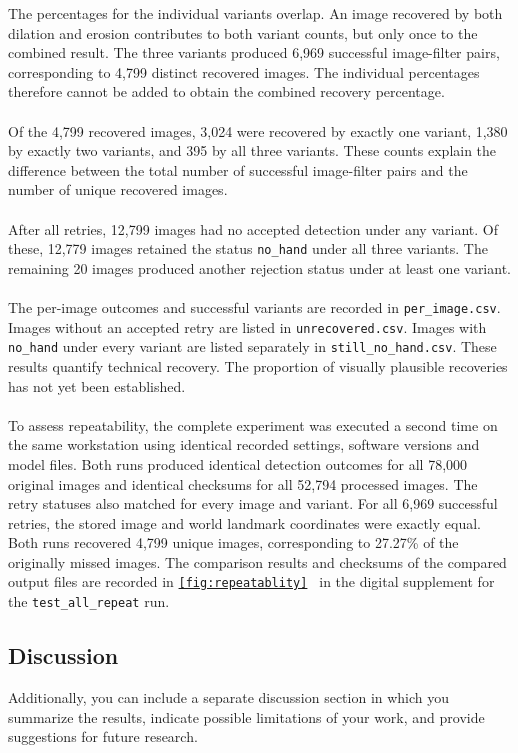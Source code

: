 \documentclass{article}
\begin{document}
        The percentages for the individual variants overlap. An image recovered by both dilation and erosion contributes to both variant counts, but only once to the combined result. The three variants produced 6,969 successful image-filter pairs, corresponding to 4,799 distinct recovered images. The individual percentages therefore cannot be added to obtain the combined recovery percentage.
        \\\\
        Of the 4,799 recovered images, 3,024 were recovered by exactly one variant, 1,380 by exactly two variants, and 395 by all three variants. These counts explain the difference between the total number of successful image-filter pairs and the number of unique recovered images.
        \\\\
        After all retries, 12,799 images had no accepted detection under any variant. Of these, 12,779 images retained the status \texttt{no\_hand} under all three variants. The remaining 20 images produced another rejection status under at least one variant.
        \\\\
        The per-image outcomes and successful variants are recorded in \texttt{per\_image.csv}. Images without an accepted retry are listed in \texttt{unrecovered.csv}. Images with \texttt{no\_hand} under every variant are listed separately in \texttt{still\_no\_hand.csv}. These results quantify technical recovery. The proportion of visually plausible recoveries has not yet been established.
        \\\\
        To assess repeatability, the complete experiment was executed a second time on the same workstation using identical recorded settings, software versions and model files. Both runs produced identical detection outcomes for all 78,000 original images and identical checksums for all 52,794 processed images. The retry statuses also matched for every image and variant. For all 6,969 successful retries, the stored image and world landmark coordinates were exactly equal. Both runs recovered 4,799 unique images, corresponding to 27.27\% of the originally missed images. The comparison results and checksums of the compared output files are recorded in \texttt{\ref{fig:repeatablity} } in the digital supplement for the \texttt{test\_all\_repeat} run.
        
    \subsection{Discussion}
\iffalse
        Additionally, you can include a separate discussion section in which you summarize the results, indicate possible limitations of your work, and provide suggestions for future research.
\end{document}
